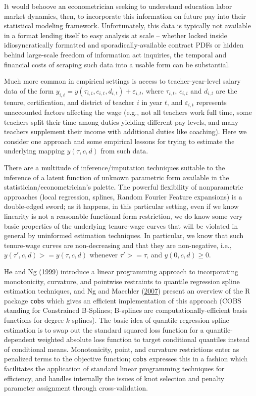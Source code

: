 \documentclass[12pt,]{article}
\begin{document}
It would behoove an econometrician seeking to understand education labor
market dynamics, then, to incorporate this information on future pay
into their statistical modeling framework. Unfortunately, this data is
typically not available in a format lending itself to easy analysis at
scale -- whether locked inside idiosyncratically formatted and
sporadically-available contract PDFs or hidden behind large-scale
freedom of information act inquiries, the temporal and financial costs
of scraping such data into a usable form can be substantial.

Much more common in empirical settings is access to teacher-year-level
salary data of the form
\(y_{i, t} = y(\tau_{i, t}, c_{i, t}, d_{i, t}) + \varepsilon_{i, t}\),
where \(\tau_{i,t}\), \(c_{i, t}\) and \(d_{i, t}\) are the tenure,
certification, and district of teacher \(i\) in year \(t\), and
\(\varepsilon_{i, t}\) represents unaccounted factors affecting the wage
(e.g., not all teachers work full time, some teachers split their time
among duties yielding different pay levels, and many teachers supplement
their income with additional duties like coaching). Here we consider one
approach and some empirical lessons for trying to estimate the
underlying mapping \(y(\tau, c, d)\) from such data.

There are a multitude of inference/imputation techniques suitable to the
inference of a latent function of unknown parametric form available in
the statistician/econometrician's palette. The powerful flexibility of
nonparametric approaches (local regression, splines, Random Fourier
Feature expansions) is a double-edged sword; as it happens, in this
particular setting, even if we know linearity is not a reasonable
functional form restriction, we do know some very basic properties of
the underlying tenure-wage curves that will be violated in general by
uninformed estimation techniques. In particular, we know that such
tenure-wage curves are non-decreasing and that they are non-negative,
i.e., \(y(\tau', c, d) >= y(\tau, c, d)\) whenever \(\tau' >= \tau\),
and \(y(0, c, d) \geq 0\).

He and Ng (\protect\hyperlink{ref-he}{1999}) introduce a linear
programming approach to incorporating monotonicity, curvature, and
pointwise restraints to quantile regression spline estimation
techniques, and Ng and Maechler (\protect\hyperlink{ref-ng}{2007})
present an overview of the R package \texttt{cobs} which gives an
efficient implementation of this approach (COBS standing for Constrained
B-Splines; B-splines are computationally-efficient basis functions for
degree \(k\) splines). The basic idea of quantile regression spline
estimation is to swap out the standard squared loss function for a
quantile-dependent weighted absolute loss function to target conditional
quantiles instead of conditional means. Monotonicity, point, and
curvature restrictions enter as penalized terms to the objective
function; \texttt{cobs} expresses this in a fashion which facilitates
the application of standard linear programming techniques for
efficiency, and handles internally the issues of knot selection and
penalty parameter assignment through cross-validation.
\end{document}
